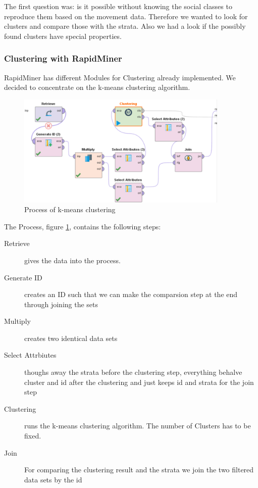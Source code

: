 The first question was: is it possible without knowing the social classes to reproduce them based on the movement data. Therefore we wanted to look for clusters and compare those with the strata. Also we had a look if the possibly found clusters have special properties.

\subsubsection{Clustering with RapidMiner}

RapidMiner has different Modules for Clustering already implemented. We decided to concentrate on the k-means clustering algorithm.
\begin{figure}[!htbp]
\centering
\includegraphics[width=0.9\textwidth]{ClusteringRapid.PNG}
\caption{Process of k-means clustering}
\label{fig: kclust}
\end{figure}


The Process, figure \ref{fig: kclust}, contains the following steps:
\begin{description}
	\item[Retrieve] gives the data into the process. 
  \item[Generate ID] creates an ID such that we can make the comparsion step at the end through joining the sets
  \item[Multiply] creates two identical data sets
  \item[Select Attrbiutes] thoughs away the strata before the clustering step, everything behalve cluster and id after the clustering and just keeps id and strata for the join step
	\item[Clustering] runs the k-means clustering algorithm. The number of Clusters has to be fixed.
	\item[Join] For comparing the clustering result and the strata we join the two filtered data sets by the id
\end{description}

